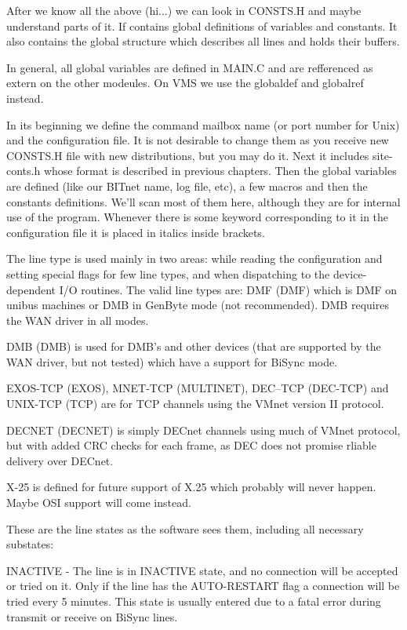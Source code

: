 After we know all the above (hi...) we can look in CONSTS.H and maybe
understand  parts of it. If contains global definitions of variables and
constants. It also contains the global  structure  which  describes  all
lines and holds their buffers.

In  general,  all  global  variables  are  defined  in MAIN.C and are
refferenced as extern on the other modeules. On VMS we use the globaldef
and globalref instead.

In  its  beginning we define the command mailbox name (or port number
for Unix) and the configuration file. It is not desirable to change them
as  you receive new CONSTS.H file with new distributions, but you may do
it. Next it includes site-conts.h whose format is described in  previous
chapters.  Then  the global variables are defined (like our BITnet name,
log file, etc), a few macros and then the constants  definitions.  We'll
scan  most  of  them  here,  although  they  are for internal use of the
program. Whenever there is some  keyword  corresponding  to  it  in  the
configuration file it is placed in italics inside brackets.


The  line  type  is  used  mainly  in  two  areas:  while reading the
configuration and setting special flags for few  line  types,  and  when
dispatching to the device-dependent I/O routines.
The  valid  line types are: DMF (DMF) which is DMF on unibus machines
or DMB in GenByte mode (not recommended). DMB requires the WAN driver in
all modes.

DMB (DMB) is used for DMB's and other devices (that are supported by the
WAN driver, but not tested) which have a support for BiSync mode.

EXOS-TCP (EXOS), MNET-TCP (MULTINET), DEC--TCP  (DEC-TCP)  and  UNIX-TCP
(TCP) are for TCP channels using the VMnet version II protocol.

DECNET  (DECNET) is simply DECnet channels using much of VMnet protocol,
but with added CRC checks for  each  frame,  as  DEC  does  not  promise
rliable delivery over DECnet.

X-25  is  defined  for  future support of X.25 which probably will never
happen. Maybe OSI support will come instead.


These are the line states as the software sees  them,  including  all
necessary substates:

INACTIVE  -  The  line  is  in INACTIVE state, and no connection will be
accepted or tried on it. Only if the line has the  AUTO-RESTART  flag  a
connection  will be tried every 5 minutes. This state is usually entered
due to a fatal error during transmit or receive on BiSync lines.

